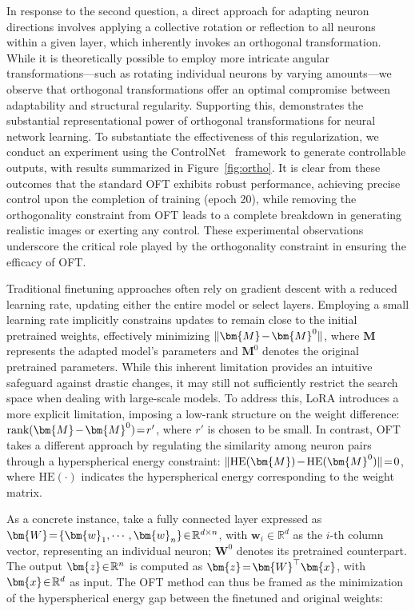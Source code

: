 In response to the second question, a direct approach for adapting neuron directions involves applying a collective rotation or reflection to all neurons within a given layer, which inherently invokes an orthogonal transformation. While it is theoretically possible to employ more intricate angular transformations—such as rotating individual neurons by varying amounts—we observe that orthogonal transformations offer an optimal compromise between adaptability and structural regularity. Supporting this, \cite{liu2021orthogonal} demonstrates the substantial representational power of orthogonal transformations for neural network learning. To substantiate the effectiveness of this regularization, we conduct an experiment using the ControlNet~\cite{zhang2023adding} framework to generate controllable outputs, with results summarized in Figure~\ref{fig:ortho}. It is clear from these outcomes that the standard OFT exhibits robust performance, achieving precise control upon the completion of training (epoch 20), while removing the orthogonality constraint from OFT leads to a complete breakdown in generating realistic images or exerting any control. These experimental observations underscore the critical role played by the orthogonality constraint in ensuring the efficacy of OFT.

Traditional finetuning approaches often rely on gradient descent with a reduced learning rate, updating either the entire model or select layers. Employing a small learning rate implicitly constrains updates to remain close to the initial pretrained weights, effectively minimizing $\thickmuskip=2mu \medmuskip=2mu \| \bm{M} - \bm{M}^0\|$, where $\bm{M}$ represents the adapted model’s parameters and $\bm{M}^0$ denotes the original pretrained parameters. While this inherent limitation provides an intuitive safeguard against drastic changes, it may still not sufficiently restrict the search space when dealing with large-scale models. To address this, LoRA introduces a more explicit limitation, imposing a low-rank structure on the weight difference: $\thickmuskip=2mu \medmuskip=2mu \text{rank}(\bm{M} - \bm{M}^0)=r'$, where $r'$ is chosen to be small. In contrast, OFT takes a different approach by regulating the similarity among neuron pairs through a hyperspherical energy constraint: $\thickmuskip=2mu \medmuskip=2mu \| \text{HE}(\bm{M})-\text{HE}(\bm{M}^0) \|=0$, where $\text{HE}(\cdot)$ indicates the hyperspherical energy corresponding to the weight matrix. 

As a concrete instance, take a fully connected layer expressed as $\thickmuskip=2mu \medmuskip=2mu \bm{W}=\{\bm{w}_1,\cdots,\bm{w}_n\}\in\mathbb{R}^{d\times n}$, with $\bm{w}_i\in\mathbb{R}^{d}$ as the $i$-th column vector, representing an individual neuron; $\bm{W}^0$ denotes its pretrained counterpart. The output $\thickmuskip=2mu \medmuskip=2mu \bm{z}\in\mathbb{R}^n$ is computed as $\thickmuskip=2mu \medmuskip=2mu \bm{z}=\bm{W}^\top\bm{x}$, with $\thickmuskip=2mu \medmuskip=2mu \bm{x}\in\mathbb{R}^d$ as input. The OFT method can thus be framed as the minimization of the hyperspherical energy gap between the finetuned and original weights:

